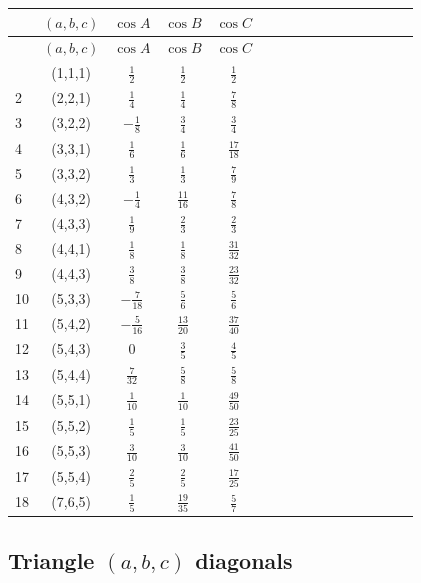 \documentclass[11pt]{article}
\begin{document}
\begin{longtable}{ | p{1cm}| *{15}{c|} }
\hline
  & $(a,b,c)$ & $\cos{A}$ & $\cos{B}$ & $\cos{C}$ \\
\hline\endhead
\hline
  & $(a,b,c)$ & $\cos{A}$ & $\cos{B}$ & $\cos{C}$ \\
\hline\endfoot
1 & (1,1,1) & $\frac{1}{2}$ & $\frac{1}{2}$ & $\frac{1}{2}$ \\
2 & (2,2,1) & $\frac{1}{4}$ & $\frac{1}{4}$ & $\frac{7}{8}$ \\
3 & (3,2,2) & $-\frac{1}{8}$ & $\frac{3}{4}$ & $\frac{3}{4}$ \\
4 & (3,3,1) & $\frac{1}{6}$ & $\frac{1}{6}$ & $\frac{17}{18}$ \\
5 & (3,3,2) & $\frac{1}{3}$ & $\frac{1}{3}$ & $\frac{7}{9}$ \\
6 & (4,3,2) & $-\frac{1}{4}$ & $\frac{11}{16}$ & $\frac{7}{8}$ \\
7 & (4,3,3) & $\frac{1}{9}$ & $\frac{2}{3}$ & $\frac{2}{3}$ \\
8 & (4,4,1) & $\frac{1}{8}$ & $\frac{1}{8}$ & $\frac{31}{32}$ \\
9 & (4,4,3) & $\frac{3}{8}$ & $\frac{3}{8}$ & $\frac{23}{32}$ \\
10 & (5,3,3) & $-\frac{7}{18}$ & $\frac{5}{6}$ & $\frac{5}{6}$ \\
11 & (5,4,2) & $-\frac{5}{16}$ & $\frac{13}{20}$ & $\frac{37}{40}$ \\
12 & (5,4,3) & $0$ & $\frac{3}{5}$ & $\frac{4}{5}$ \\
13 & (5,4,4) & $\frac{7}{32}$ & $\frac{5}{8}$ & $\frac{5}{8}$ \\
14 & (5,5,1) & $\frac{1}{10}$ & $\frac{1}{10}$ & $\frac{49}{50}$ \\
15 & (5,5,2) & $\frac{1}{5}$ & $\frac{1}{5}$ & $\frac{23}{25}$ \\
16 & (5,5,3) & $\frac{3}{10}$ & $\frac{3}{10}$ & $\frac{41}{50}$ \\
17 & (5,5,4) & $\frac{2}{5}$ & $\frac{2}{5}$ & $\frac{17}{25}$ \\
18 & (7,6,5) & $\frac{1}{5}$ & $\frac{19}{35}$ & $\frac{5}{7}$ \\
\end{longtable}

\subsection{Triangle $(a,b,c)$ diagonals}
\end{document}
